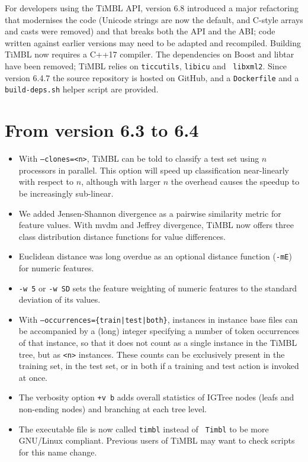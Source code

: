 \documentclass{book}
\begin{document}
For developers using the TiMBL API, version 6.8 introduced a major
refactoring that modernises the code (Unicode strings are now the
default, and C-style arrays and casts were removed) and that breaks
both the API and the ABI; code written against earlier versions may
need to be adapted and recompiled. Building TiMBL now requires a
C++17 compiler. The dependencies on Boost and libtar have been
removed; TiMBL relies on {\tt ticcutils}, {\tt libicu} and {\tt
  libxml2}. Since version 6.4.7 the source repository is hosted on
GitHub, and a {\tt Dockerfile} and a {\tt build-deps.sh} helper script
are provided.

\section{From version 6.3 to 6.4}

\begin{itemize}
\item With {\tt --clones=<n>}, TiMBL can be told to classify a test
  set using $n$ processors in parallel. This option will speed up
  classification near-linearly with respect to $n$, although with
  larger $n$ the overhead causes the speedup to be increasingly
  sub-linear.
\item We added Jensen-Shannon divergence as a pairwise similarity metric
  for feature values. With {\sc mvdm} and Jeffrey divergence, TiMBL
  now offers three class distribution distance functions for value
  differences.
\item Euclidean distance was long overdue as an optional distance
  function ({\tt -mE}) for numeric features.
\item {\tt -w 5} or {\tt -w SD} sets the feature weighting of numeric
  features to the standard deviation of its values.
\item With {\tt --occurrences=\{train|test|both\}}, instances in
  instance base files can be accompanied by a (long) integer
  specifying a number of token occurrences of that instance, so that
  it does not count as a single instance in the TiMBL tree, but as
  {\tt <n>} instances. These counts can be exclusively present in the
  training set, in the test set, or in both if a training and test
  action is invoked at once.
\item The verbosity option {\tt +v b} adds overall statistics of
  IGTree nodes (leafs and non-ending nodes) and branching at each tree
  level.
\item The executable file is now called {\tt timbl} instead of {\tt
    Timbl} to be more GNU/Linux compliant. Previous users of TiMBL may
  want to check scripts for this name change.
\end{itemize}
\end{document}
